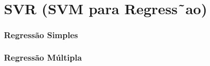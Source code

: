 \chapter{ SVR (SVM para Regress˜ao)}

\subsection{Regressão Simples}

\subsection{Regressão Múltipla}
